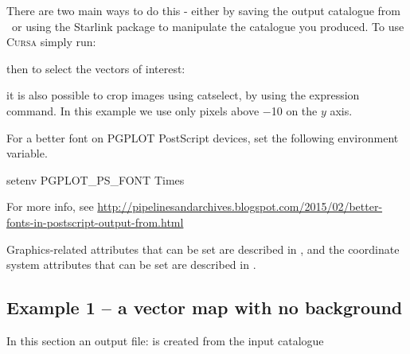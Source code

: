 There are two main ways to do this - either by saving the output
catalogue from \GAIA\ or using the Starlink package
 to manipulate
the catalogue you produced.  To use \textsc{Cursa} simply run:

\begin{terminalv}
\end{terminalv}

then to select the vectors of interest:

\begin{terminalv}
\end{terminalv}

it is also possible to crop images using catselect, by using the
expression command.  In this example we use only pixels above $-$10 on
the $y$ axis.

\begin{terminalv}
\end{terminalv}




\begin{tip}
  For a better font on PGPLOT PostScript devices, set the following
  environment variable.

\begin{terminalv}
setenv PGPLOT_PS_FONT Times
\end{terminalv}

For more info, see
\url{http://pipelinesandarchives.blogspot.com/2015/02/better-fonts-in-postscript-output-from.html}

Graphics-related attributes that can be set are described in
, and the coordinate system attributes that can be set are
described in .
\end{tip}





\subsection{ Example 1 -- a vector map with no background}
\label{section:kappa-example1}

In this section an output file:  is created from the input
catalogue 

